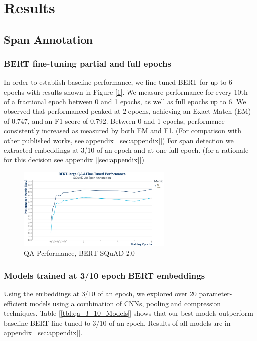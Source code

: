 \section{Results}

\subsection{Span Annotation}
\subsubsection{BERT fine-tuning partial and full epochs}
In order to establish baseline performance, we fine-tuned BERT for up to 6 epochs with results shown in Figure [\ref{fig:QnABertPerformance}]. We measure performance for every 10th of a fractional epoch between 0 and 1 epochs, as well as full epochs up to 6. We observed that performanced peaked at 2 epochs, achieving an Exact Match (EM) of 0.747, and an F1 score of 0.792. Between 0 and 1 epochs, performance consistently increased as measured by  both EM and F1. (For comparison with other published works, see appendix [\ref{sec:appendix}]) For span detection we extracted embeddings at 3/10 of an epoch and at one full epoch. (for a rationale for this decision see appendix [\ref{sec:appendix}])
\begin{figure}[ht]
	\centering
	\includegraphics[width=7.5cm]{images/QnA_BERT_Training_Performance_plot.png}
	\caption{\label{fig:QnABertPerformance}QA Performance, BERT SQuAD 2.0}
\end{figure}

\subsubsection{Models trained at 3/10 epoch BERT embeddings}
Using the embeddings at 3/10 of an epoch, we explored over 20 parameter-efficient models using a combination of CNNs, pooling and compression techniques.  Table [\ref{tbl:qa_3_10_Models}] shows that our best models outperform baseline BERT fine-tuned to 3/10 of an epoch. Results of all models are in appendix [\ref{sec:appendix}].

